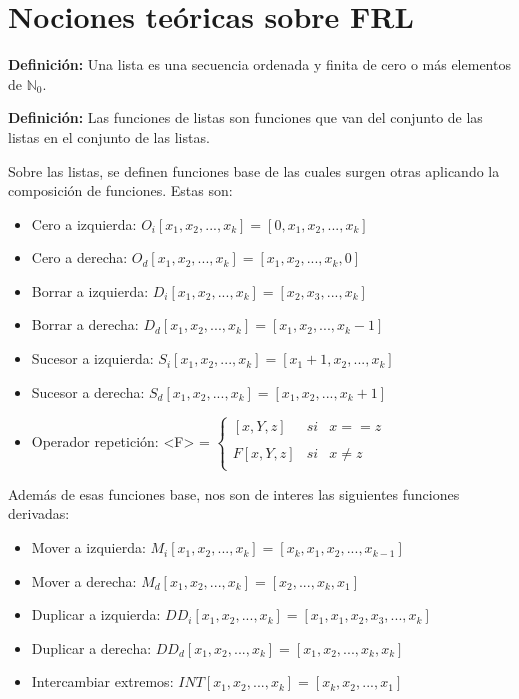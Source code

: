 \documentclass[a4paper,13pt,proof]{article}
\theoremstyle{mytheor}
\begin{document}
\section{Nociones teóricas sobre FRL}

\textbf{Definición:} Una lista es una secuencia ordenada y finita de cero o más elementos de $\mathbb{N}_0$.

\textbf{Definición:} Las funciones de listas son funciones que van del conjunto de las listas en el conjunto de las listas.

Sobre las listas, se definen funciones base de las cuales surgen otras aplicando la composición de funciones. Estas son:

\begin{itemize}
    \item Cero a izquierda: $O_i [x_1, x_2, . . . , x_k ] = [0, x_1, x_2, . . . , x_k ]$
    \item Cero a derecha: $O_d [x_1, x_2, . . . , x_k ] = [x_1, x_2, . . . , x_k , 0]$
    \item Borrar a izquierda: $D_i [x_1, x_2, . . . , x_k ] = [x_2, x_3, . . . , x_k ]$
    \item Borrar a derecha: $D_d [x_1, x_2, . . . , x_k ] = [x_1, x_2, . . . , x_k−1]$
    \item Sucesor a izquierda: $S_i [x_1, x_2, . . . , x_k ] = [x_1 + 1, x_2, . . . , x_k ]$
    \item Sucesor a derecha: $S_d [x_1, x_2, . . . , x_k ] = [x_1, x_2, . . . , x_k + 1]$
    \item Operador repetición:
    <F> = $\left\{ \begin{array}{lcc}
             [x, Y , z] &   si  & x == z \\
             \\ F[x, Y , z] &  si &x \not = z \\
             \end{array}
   \right.$
\end{itemize}
 
 Además de esas funciones base, nos son de interes las siguientes funciones derivadas:
 
 \begin{itemize}
    \item Mover a izquierda: $M_i [x_1, x_2, . . . , x_k ] = [ x_k,x_1, x_2, . . . , x_{k-1} ]$
    \item Mover a derecha: $M_d [x_1, x_2, . . . , x_k ] = [ x_2, . . . , x_k , x_1]$
    \item Duplicar a izquierda: $DD_i [x_1, x_2, . . . , x_k ] = [x_1,x_1, x_2, x_3, . . . , x_k ]$
    \item Duplicar a derecha: $DD_d [x_1, x_2, . . . , x_k ] = [x_1, x_2, . . . , x_k, x_k]$
    \item Intercambiar extremos: $INT [x_1, x_2, . . . , x_k ] = [x_k, x_2, . . . ,x_1  ]$
\end{itemize}
 
\end{document}
